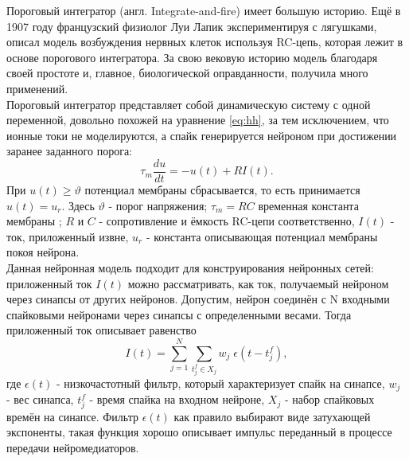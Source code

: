 \documentclass[a4paper,10pt]{article}
\begin{document}
\indent Пороговый интегратор (англ. Integrate-and-fire) имеет большую историю. Ещё в 1907 году 	французский физиолог Луи Лапик экспериментируя с лягушками, описал модель возбуждения нервных клеток используя RC-цепь\cite{Lapicque}, которая лежит в основе порогового интегратора. За свою вековую историю модель благодаря своей простоте и, главное, биологической оправданности, получила много применений.\\
   \indent Пороговый интегратор представляет собой динамическую систему с одной переменной, довольно похожей на уравнение \eqref{eq:hh}, за тем исключением, что ионные токи не моделируются, а спайк генерируется нейроном при достижении заранее заданного порога:\\
   \begin{equation}\label{eq:iaf}
   \tau_{m}\frac{du}{dt} =-u(t)+R I(t).
   \end{equation}
При $u(t) \geq \vartheta$ потенциал мембраны сбрасывается, то есть принимается $u(t)=u_{r}$.
Здесь $\vartheta$ - порог напряжения; $\tau_{m}=RC$ временная константа мембраны ; $R$ и $C$ - сопротивление и ёмкость RC-цепи соответственно, $I(t)$ - ток, приложенный извне, $u_{r}$ - константа описывающая потенциал мембраны покоя нейрона.\\   
\indent Данная нейронная модель подходит для конструирования нейронных сетей: приложенный ток $I(t)$ можно рассматривать, как ток, получаемый нейроном через синапсы от других нейронов. Допустим, нейрон соединён с N входными спайковыми нейронами через синапсы с определенными весами. Тогда приложенный ток описывает равенство
\begin{equation}\label{eq:iaf_syn}
I(t) = \sum_{j=1}^{N} \sum_{t_{j}^{f}\in X_{j}} w_{j}\; \epsilon(t-t_{j}^{f}),
\end{equation}
где $\epsilon(t)$ - низкочастотный фильтр, который характеризует спайк на синапсе, $w_{j}$ - вес синапса, $t_{j}^{f}$ - время спайка на входном нейроне, $X_{j}$ - набор спайковых времён на синапсе. Фильтр $\epsilon(t)$ как правило выбирают виде затухающей экспоненты, такая функция хорошо описывает импульс переданный в процессе передачи нейромедиаторов.\\
\end{document}
